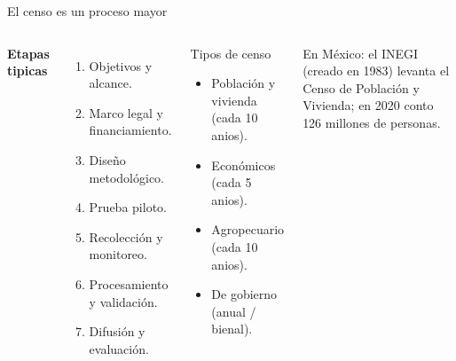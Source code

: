 \documentclass[aspectratio=169]{beamer}
\begin{document}
\begin{frame}{El censo es un proceso mayor}
  \begin{columns}[t]
      \textbf{Etapas tipicas}
      \begin{enumerate}
        \item Objetivos y alcance.
        \item Marco legal y financiamiento.
        \item Dise\~no metodol\'ogico.
        \item Prueba piloto.
        \item Recolecci\'on y monitoreo.
        \item Procesamiento y validaci\'on.
        \item Difusi\'on y evaluaci\'on.
      \end{enumerate}
      \begin{block}{Tipos de censo}
        \begin{itemize}
          \item Poblaci\'on y vivienda (cada 10 anios).
          \item Econ\'omicos (cada 5 anios).
          \item Agropecuario (cada 10 anios).
          \item De gobierno (anual / bienal).
        \end{itemize}
      \end{block}
      \footnotesize En M\'exico: el INEGI (creado en 1983) levanta el Censo de
      Poblaci\'on y Vivienda; en 2020 conto 126 millones de personas.
  \end{columns}
\end{frame}
\end{document}
